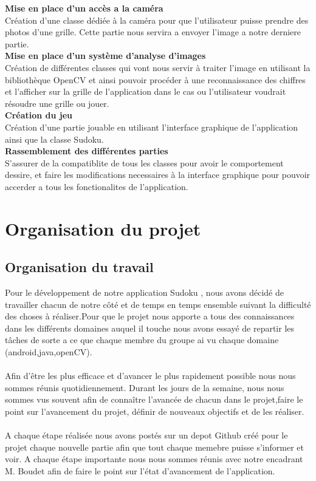 \documentclass{article}
\begin{document}
\textbf{Mise en place d'un accès a la caméra}\\
Création d'une classe dédiée à la caméra pour que l'utilisateur puisse prendre des photos d'une grille.
Cette partie nous servira a envoyer l'image a notre derniere partie.\\

\textbf{Mise en place d'un système d'analyse d'images}\\
Création de différentes classes qui vont nous servir à traiter l'image en utilisant la bibliothèque OpenCV
et ainsi pouvoir procéder à une reconnaissance des chiffres et l'afficher sur la grille de l'application dans le cas ou l'utilisateur voudrait résoudre une grille ou jouer.\\

\textbf{Création du jeu}\\
Création d'une partie jouable en utilisant l'interface graphique de l'application ainsi que la classe Sudoku.\\

\textbf{Rassemblement des différentes parties}\\
S'assurer de la compatiblite de tous les classes pour avoir le comportement dessire, et faire les modifications necessaires à la interface graphique pour pouvoir accerder a tous les fonctionalites de l'application.






\newpage
\section{Organisation du projet}
\subsection{Organisation du travail}
Pour le développement de notre application Sudoku , nous avons décidé de travailler chacun de notre côté et de temps en temps ensemble suivant la difficulté des choses à réaliser.Pour que le projet nous apporte a tous des connaissances dans les différents domaines auquel il touche nous avons essayé de repartir les tâches de sorte a ce que chaque membre du groupe ai vu chaque domaine (android,java,openCV).\\\\
Afin d’être les plus efficace et d’avancer le plus rapidement possible nous nous sommes réunis
quotidiennement. Durant les jours de la semaine, nous nous sommes vus souvent afin de connaître l'avancée de chacun dans le projet,faire le point sur l’avancement du projet, définir de nouveaux objectifs et de les réaliser.\\\\
A chaque étape réalisée nous avons postés sur un depot Github créé pour le projet chaque nouvelle partie afin que tout chaque memebre puisse s'informer et voir.
A chaque étape importante nous nous sommes réunis avec notre encadrant M. Boudet afin de faire le point sur l’état d’avancement de l’application.\\\\
\end{document}
